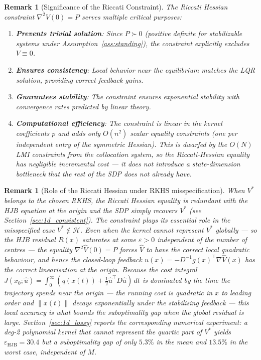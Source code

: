 \documentclass[11pt]{article}
\newtheorem{remark}[theorem]{Remark}
\begin{document}
\begin{remark}[Significance of the Riccati Constraint]
\label{rem:riccati_significance}
The Riccati Hessian constraint $\nabla^2 V(0) = P$ serves multiple critical purposes:
\begin{enumerate}
\item \textbf{Prevents trivial solution}: Since $P \succ 0$ (positive definite for stabilizable systems under Assumption~\ref{ass:standing}), the constraint explicitly excludes $V \equiv 0$.
\item \textbf{Ensures consistency}: Local behavior near the equilibrium matches the LQR solution, providing correct feedback gains.
\item \textbf{Guarantees stability}: The constraint ensures exponential stability with convergence rates predicted by linear theory.
\item \textbf{Computational efficiency}: The constraint is linear in the kernel coefficients $p$ and adds only $O(n^2)$ scalar equality constraints (one per independent entry of the symmetric Hessian). This is dwarfed by the $O(N)$ LMI constraints from the collocation system, so the Riccati-Hessian equality has negligible incremental cost --- it does not introduce a state-dimension bottleneck that the rest of the SDP does not already have.
\end{enumerate}
\end{remark}

\begin{remark}[Role of the Riccati Hessian under RKHS misspecification]
\label{rem:riccati_misspec}
When $V^*$ belongs to the chosen RKHS, the Riccati Hessian equality is redundant with the HJB equation at the origin and the SDP simply recovers $V^*$ (see Section~\ref{sec:1d_consistent}). The constraint plays its essential role in the misspecified case $V^*\notin\mathcal{H}$. Even when the kernel cannot represent $V^*$ globally --- so the HJB residual $R(x)$ saturates at some $\varepsilon > 0$ independent of the number of centres --- the equality $\nabla^2\hat V(0) = P$ forces $\hat V$ to have the correct local quadratic behaviour, and hence the closed-loop feedback $\hat u(x) = -D^{-1}g(x)^\top\nabla\hat V(x)$ has the correct linearisation at the origin. Because the cost integral $J(x_0;\hat u) = \int_0^\infty (q(x(t)) + \tfrac12 \hat u^\top D\hat u)\,dt$ is dominated by the time the trajectory spends near the origin --- the running cost is quadratic in $x$ to leading order and $\|x(t)\|$ decays exponentially under the stabilising feedback --- this local accuracy is what bounds the suboptimality gap when the global residual is large. Section~\ref{sec:1d_lossy} reports the corresponding numerical experiment: a deg-2 polynomial kernel that cannot represent the quartic part of $V^*$ yields $\varepsilon_{\mathrm{HJB}} = 30.4$ but a suboptimality gap of only $5.3\%$ in the mean and $13.5\%$ in the worst case, independent of $M$.
\end{remark}
\end{document}
